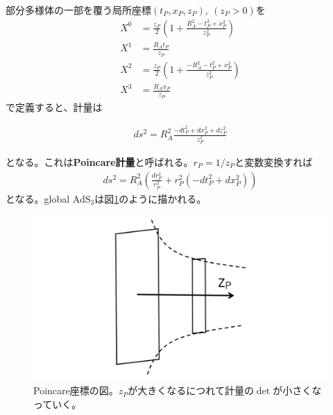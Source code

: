 部分多様体の一部を覆う局所座標$(t_P,x_P,z_P),\ (z_P>0)$を
\begin{align}
X^0&=\frac{z_P}{2}\left( 1+\frac{R_A^2-t_P^2+x_P^2}{z_P^2} \right)\\
X^1&=\frac{R_A t_P}{z_P}\\
X^2&=\frac{z_P}{2}\left( 1+\frac{-R_A^2-t_P^2+x_P^2}{z_P^2} \right)\\
X^3&=\frac{R_A x_P}{z_P}
\end{align}
で定義すると、計量は
\begin{oframed}
\begin{align}\label{Poincaremetric}
ds^2=R_A^2\frac{-dt_P^2+dx_P^2+dz_P^2}{z_P^2}
\end{align}
\end{oframed}
となる。これは\textbf{Poincare計量}と呼ばれる。$r_P=1/z_P$と変数変換すれば
\begin{align}\label{Poincarer}
ds^2=R_A^2\left(\frac{dr_P^2}{r_P^2}+r_P^2(-dt_P^2+dx_P^2)\right)
\end{align}
となる。global AdS$_3$は図\ref{fig:poincare}のように描かれる。
\begin{figure}[h]
	\centering
	\includegraphics[width=0.7\linewidth]{Poincare.pdf}
	\caption{Poincare座標の図。$z_P$が大きくなるにつれて計量の$\det$が小さくなっていく。}
	\label{fig:poincare}
\end{figure}

